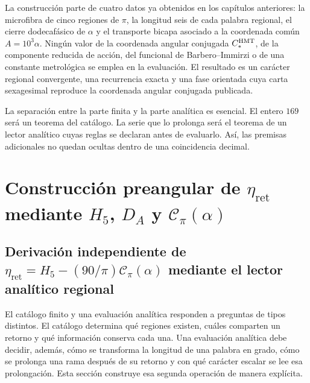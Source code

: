 La construcción parte de cuatro datos ya obtenidos en los capítulos
anteriores: la microfibra de cinco regiones de \(\pi\), la longitud seis de
cada palabra regional, el cierre dodecafásico de \(\alpha\) y el transporte
bicapa asociado a la coordenada común
\(A=10^3\alpha\). Ningún valor de la coordenada angular conjugada \(C_*^{\rm HMT}\), de la componente reducida de
acción, del funcional de Barbero--Immirzi o de una constante metrológica se
emplea en la evaluación. El resultado es un carácter regional convergente,
una recurrencia exacta y una fase orientada cuya carta sexagesimal reproduce
la coordenada angular conjugada publicada.

La separación entre la parte finita y la parte analítica es esencial. El
entero \(169\) será un teorema del catálogo. La serie que lo prolonga será el
teorema de un lector analítico cuyas reglas se declaran antes de evaluarlo.
Así, las premisas adicionales no quedan ocultas dentro de una coincidencia
decimal.

\section{Construcción preangular de \texorpdfstring{\(\eta_{\mathrm{ret}}\)}{eta_ret} mediante \texorpdfstring{\(H_5\)}{H5}, \texorpdfstring{\(D_A\)}{D_A} y \texorpdfstring{\(\mathscr C_\pi(\alpha)\)}{C_pi(alpha)}}
\label{sec:s102:c38:2}

\subsection{Derivación independiente de \texorpdfstring{\(\eta_{\mathrm{ret}}=H_5-(90/\pi)\mathscr C_\pi(\alpha)\)}{eta_ret=H5-(90/pi)C_pi(alpha)} mediante el lector analítico regional}
\label{sec:s102:c38:2:1}


El catálogo finito y una evaluación analítica responden a preguntas de tipos
distintos. El catálogo determina qué regiones existen, cuáles comparten un
retorno y qué información conserva cada una. Una evaluación analítica debe
decidir, además, cómo se transforma la longitud de una palabra en grado, cómo
se prolonga una rama después de su retorno y con qué carácter escalar se lee
esa prolongación. Esta sección construye esa segunda operación de manera
explícita.

